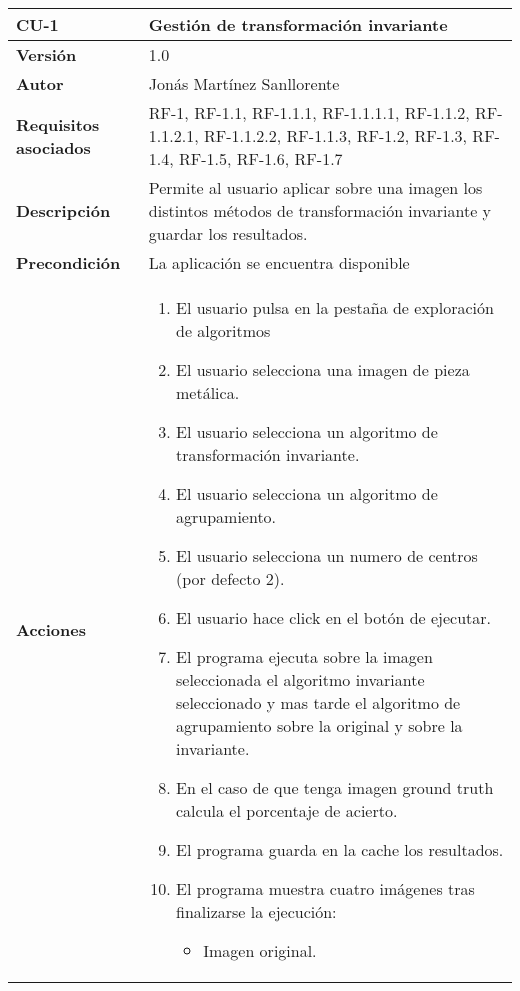 \begin{table}[p]
	\centering
	\begin{tabularx}{\linewidth}{ p{} p{} }
		\toprule
		\textbf{CU-1}    & \textbf{Gestión de transformación invariante}\\
		\toprule
		\textbf{Versión}              & 1.0    \\
		\textbf{Autor}                & Jonás Martínez Sanllorente \\
		\textbf{Requisitos asociados} & RF-1, RF-1.1, RF-1.1.1, RF-1.1.1.1, RF-1.1.2, RF-1.1.2.1, RF-1.1.2.2, RF-1.1.3, RF-1.2, RF-1.3, RF-1.4, RF-1.5, RF-1.6, RF-1.7 \\
		\textbf{Descripción}          & Permite al usuario aplicar sobre una imagen los distintos métodos de transformación invariante y guardar los resultados.\\
		\textbf{Precondición}         & La aplicación se encuentra disponible \\
		\textbf{Acciones}             &
		\begin{enumerate}
			\def\labelenumi{\arabic{enumi}.}
			\tightlist
			\item El usuario pulsa en la pestaña de exploración de algoritmos
            \item El usuario selecciona una imagen de pieza metálica.
            \item El usuario selecciona un algoritmo de transformación invariante.
            \item El usuario selecciona un algoritmo de agrupamiento.
            \item El usuario selecciona un numero de centros (por defecto 2).
            \item El usuario hace click en el botón de ejecutar.
            \item El programa ejecuta sobre la imagen seleccionada el algoritmo invariante seleccionado y mas tarde el algoritmo de agrupamiento sobre la original y sobre la invariante.
            \item En el caso de que tenga imagen ground truth calcula el porcentaje de acierto.
            \item El programa guarda en la cache los resultados.
            \item El programa muestra cuatro imágenes tras finalizarse la ejecución:
            \begin{itemize}
                \item Imagen original.

\end{itemize}
\end{enumerate}
\end{tabularx}
\end{table}
